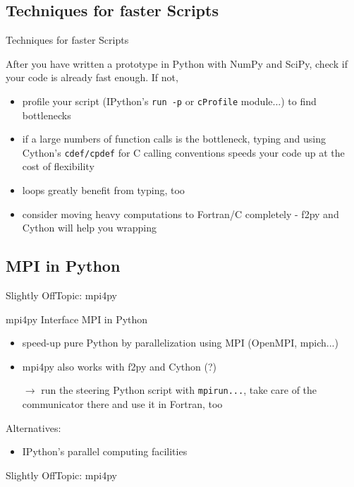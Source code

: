 \subsection{Techniques for faster Scripts}

\begin{frame}{Techniques for faster Scripts}

After you have written a prototype in Python with NumPy and SciPy,
check if your code is already fast enough. If not,

\begin{itemize}
    \item profile your script (IPython's {\texttt{run -p}} or
    {\texttt{cProfile}} module...) to find bottlenecks
    \item if a large numbers of function calls is the bottleneck,
    typing and using  Cython's {\texttt{cdef/cpdef}} for C calling
    conventions speeds your code up at the cost of flexibility
    \item loops greatly benefit from typing, too
    \item consider moving heavy computations to Fortran/C completely -
    f2py and Cython will help you wrapping
\end{itemize}

\end{frame}

\subsection{MPI in Python}

\begin{frame}{Slightly OffTopic: mpi4py}

\begin{exbox}{mpi4py}
    Interface MPI in Python
\end{exbox}

\begin{itemize}
    \item speed-up pure Python by parallelization using MPI (OpenMPI, mpich...)
    \item mpi4py also works with f2py and Cython (?)
    \item[$\rightarrow$] run the steering Python script with
    {\texttt{mpirun...}}, take care of the communicator there and use
    it in Fortran, too
\end{itemize}

Alternatives:

\begin{itemize}
    \item IPython's parallel computing facilities
\end{itemize}

\end{frame}

\begin{frame}[fragile]{Slightly OffTopic: mpi4py}



\end{frame}

